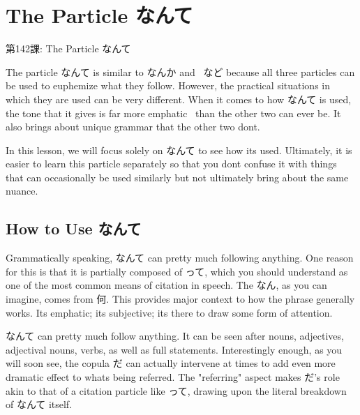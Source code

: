     
\chapter{The Particle なんて}

\begin{center}
\begin{Large}
第142課: The Particle なんて 
\end{Large}
\end{center}
 
\par{ The particle なんて is similar to なんか and  など because all three particles can be used to euphemize what they follow. However, the practical situations in which they are used can be very different. When it comes to how なんて is used, the tone that it gives is far more emphatic  than the other two can ever be. It also brings about unique grammar that the other two don\textquotesingle t. }

\par{ In this lesson, we will focus solely on なんて to see how it\textquotesingle s used. Ultimately, it is easier to learn this particle separately so that you don\textquotesingle t confuse it with things that can occasionally be used similarly but not ultimately bring about the same nuance. }
      
\section{How to Use なんて}
 
\par{ Grammatically speaking, なんて can pretty much following anything. One reason for this is that it is partially composed of って, which you should understand as one of the most common means of citation in speech. The なん, as you can imagine, comes from 何. This provides major context to how the phrase generally works. It\textquotesingle s emphatic; it\textquotesingle s subjective; it\textquotesingle s there to draw some form of attention. }

\par{ なんて can pretty much follow anything. It can be seen after nouns, adjectives, adjectival nouns, verbs, as well as full statements. Interestingly enough, as you will soon see, the copula だ can actually intervene at times to add even more dramatic effect to what\textquotesingle s being referred. The "referring" aspect makes だ's role akin to that of a citation particle like って, drawing upon the literal breakdown of なんて itself. }

